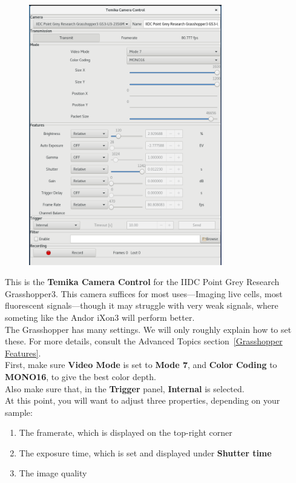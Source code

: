 \documentclass{report}
\begin{document}
\begin{figure}[h!]
\centering
\includegraphics[width=0.75\textwidth]{grasshopper}
\end{figure}

This is the \textbf{Temika Camera Control} for the IIDC Point Grey Research Grasshopper3. This camera suffices for most uses---Imaging live cells, most fluorescent signals---though it may struggle with very weak signals, where someting like the Andor iXon3 will perform better.\\

The Grasshopper has many settings. We will only roughly explain how to set these. For more details, consult the Advanced Topics section~\ref{Grasshopper Features}.\\

First, make sure \textbf{Video Mode} is set to \textbf{Mode 7}, and \textbf{Color Coding} to \textbf{MONO16}, to give the best color depth.\\

Also make sure that, in the \textbf{Trigger} panel, \textbf{Internal} is selected.\\

At this point, you will want to adjust three properties, depending on your sample:
\begin{enumerate}
	\item The framerate, which is displayed on the top-right corner
	\item The exposure time, which is set and displayed under \textbf{Shutter time}
	\item The image quality
\end{enumerate}
\end{document}
